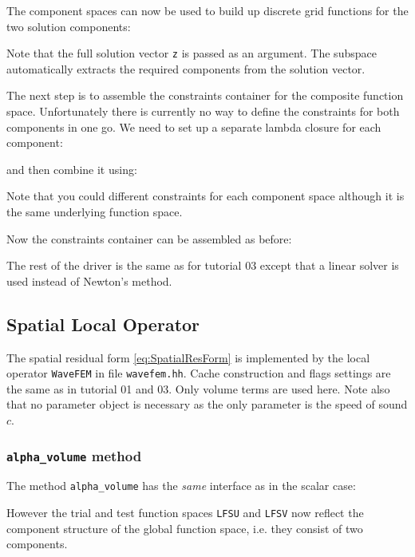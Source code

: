 \documentclass[a4paper,12pt]{article}
\begin{document}
The component spaces can now be used to build
up discrete grid functions for the two solution components:

Note that the full solution vector \lstinline{z} is passed as an argument.
The subspace automatically extracts the required components from the solution vector.

The next step is to assemble the constraints container for the composite
function space. Unfortunately there is currently no way to define the
constraints for both components in one go. We need to
set up a separate lambda closure for each component:

and then combine it using:

Note that you could different constraints for each component
space although it is the same underlying function space.

Now the constraints container can be assembled as before:


The rest of the driver is the same as for tutorial 03 except that
a linear solver is used instead of Newton's method.

\subsection{Spatial Local Operator}

The spatial residual form \eqref{eq:SpatialResForm} is
implemented by the local operator \lstinline{WaveFEM} in
file \lstinline{wavefem.hh}. Cache construction and flags settings
are the same as in tutorial 01 and 03. Only volume terms are used here.
Note also that no parameter object is necessary as the only parameter
is the speed of sound $c$.

\subsubsection*{\lstinline{alpha_volume} method}

The method \lstinline{alpha_volume} has the \textit{same} interface
as in the scalar case:

However the trial and test function spaces \lstinline{LFSU} and \lstinline{LFSV}
now reflect the component structure of the global function space, i.e.
they consist of two components.
\end{document}
